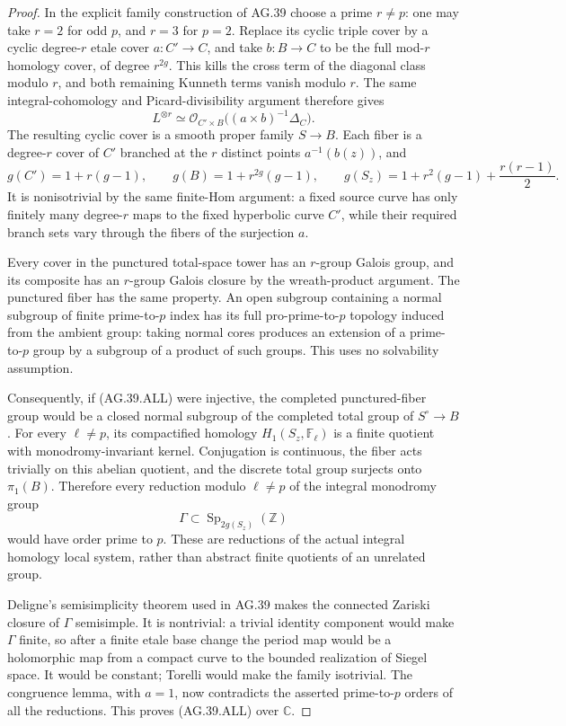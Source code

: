 \begin{proof}
In the explicit family construction of AG.39 choose a prime
\(r\ne p\): one may take \(r=2\) for odd \(p\), and
\(r=3\) for \(p=2\). Replace its cyclic triple cover by a
cyclic degree-\(r\) etale cover \(a:C'\to C\), and take
\(b:B\to C\) to be the full mod-\(r\) homology cover,
of degree \(r^{2g}\). This kills the cross term of the
diagonal class modulo \(r\), and both remaining Kunneth
terms vanish modulo \(r\). The same integral-cohomology and
Picard-divisibility argument therefore gives
\[
       L^{\otimes r}\simeq
       \mathcal O_{C'\times B}\bigl((a\times b)^{-1}\Delta_C\bigr).
\]
The resulting cyclic cover is a smooth proper family
\(S\to B\). Each fiber is a degree-\(r\) cover of \(C'\)
branched at the \(r\) distinct points \(a^{-1}(b(z))\), and
\[
   g(C')=1+r(g-1),\qquad g(B)=1+r^{2g}(g-1),\qquad
   g(S_z)=1+r^2(g-1)+\frac{r(r-1)}2.
\]
It is nonisotrivial by the same finite-Hom argument: a fixed
source curve has only finitely many degree-\(r\) maps to the
fixed hyperbolic curve \(C'\), while their required branch
sets vary through the fibers of the surjection \(a\).

Every cover in the punctured total-space tower has an
\(r\)-group Galois group, and its composite has an
\(r\)-group Galois closure by the wreath-product argument.
The punctured fiber has the same property. An open subgroup
containing a normal subgroup of finite prime-to-\(p\) index
has its full pro-prime-to-\(p\) topology induced from the
ambient group: taking normal cores produces an extension
of a prime-to-\(p\) group by a subgroup of a product of such
groups. This uses no solvability assumption.

Consequently, if (AG.39.ALL) were injective, the completed
punctured-fiber group would be a closed normal subgroup of
the completed total group of \(S^\circ\to B\). For every
\(\ell\ne p\), its compactified homology
\(H_1(S_z,\mathbb F_\ell)\) is a finite quotient with
monodromy-invariant kernel. Conjugation is continuous, the
fiber acts trivially on this abelian quotient, and the
discrete total group surjects onto \(\pi_1(B)\). Therefore
every reduction modulo \(\ell\ne p\) of the integral
monodromy group
\[
       \Gamma\subset\operatorname{Sp}_{2g(S_z)}(\mathbb Z)
\]
would have order prime to \(p\). These are reductions of
the actual integral homology local system, rather than
abstract finite quotients of an unrelated group.

Deligne's semisimplicity theorem used in AG.39 makes the
connected Zariski closure of \(\Gamma\) semisimple. It is
nontrivial: a trivial identity component would make
\(\Gamma\) finite, so after a finite etale base change the
period map would be a holomorphic map from a compact curve
to the bounded realization of Siegel space. It would be
constant; Torelli would make the family isotrivial. The
congruence lemma, with \(a=1\), now contradicts the asserted
prime-to-\(p\) orders of all the reductions. This proves
(AG.39.ALL) over \(\mathbb C\).


\end{proof}
